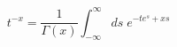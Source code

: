 \documentclass{jsarticle}
\begin{document}
\begin{equation}
  t^{-x} = \frac{1}{\Gamma (x)} \int_{-\infty}^{\infty} ds\; e^{-te^{s}+xs}
\end{equation}
\end{document}
